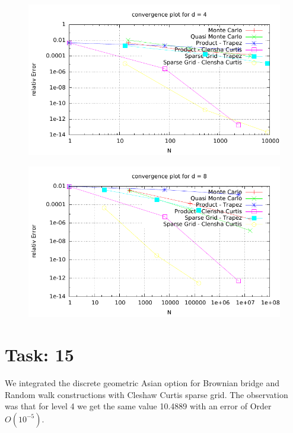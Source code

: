 \documentclass{article}
\begin{document}
\begin{figure}[htbp]
  \centering
     \includegraphics[width=1.0\textwidth]{../Task13/sh3_task13_convergencePlotd4.pdf}
\end{figure}
\newpage
\begin{figure}[htbp]
  \centering
     \includegraphics[width=1.0\textwidth]{../Task13/sh3_task13_convergencePlotd8.pdf}
\end{figure}

\section*{Task: 15}
We integrated the discrete geometric Asian option for Brownian bridge and Random walk constructions with Cleshaw Curtis sparse grid. The observation was that for level 4 we get the same value  10.4889 with an error of Order $ O(10^{-5}) $.

\newpage
\end{document}
